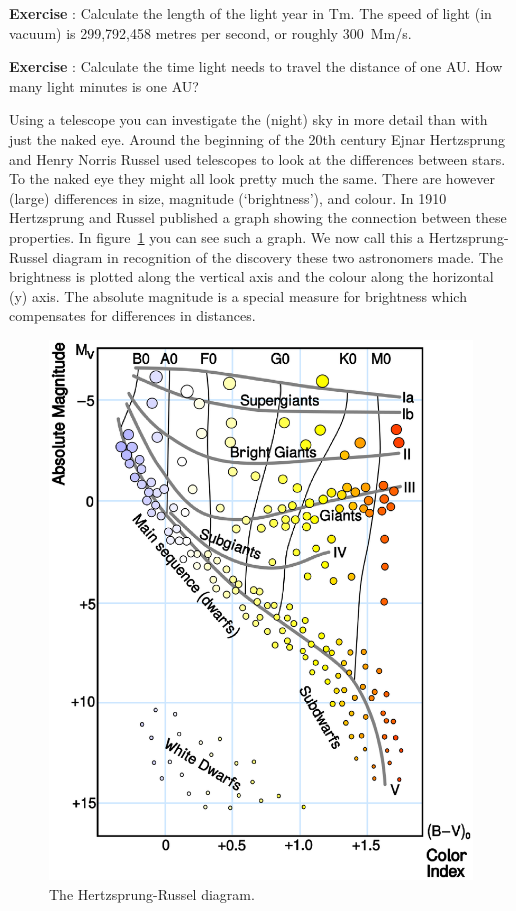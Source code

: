 \documentclass[12pt,a4paper]{article}
\numberwithin{equation}{section}
\numberwithin{figure}{section}
\newcounter{Exercise}
\numberwithin{table}{section}
\begin{document}
\begin{shaded}
\textbf{Exercise \theExercise {}} : Calculate the length of the light year in Tm. The speed of light (in vacuum) is 299,792,458 metres per second, or roughly 300~Mm/s.\end{shaded}
\begin{shaded}
\textbf{Exercise \theExercise {}} : Calculate the time light needs to travel the distance of one AU. How many light minutes is one AU?\end{shaded}

Using a telescope you can investigate the (night) sky in more detail than with just the naked eye. Around the beginning of the 20th century Ejnar Hertzsprung and Henry Norris Russel used telescopes to look at the differences between stars. To the naked eye they might all look pretty much the same. There are however (large) differences in size, magnitude (`brightness'), and colour. In 1910 Hertzsprung and Russel published a graph showing the connection between these properties. In figure~\ref{fig:hertzsprung} you can see such a graph. We now call this a Hertzsprung-Russel diagram in recognition of the discovery these two astronomers made. The brightness is plotted along the vertical axis and the colour along the horizontal (y) axis. The absolute magnitude is a special measure for brightness which compensates for differences in distances.
\begin{figure}\begin{center}
\includegraphics[scale=0.7]{1000px-H-R_diagram.svg.eps}%
\caption{The Hertzsprung-Russel diagram.}\label{fig:hertzsprung}
\end{center}\end{figure}
\end{document}
